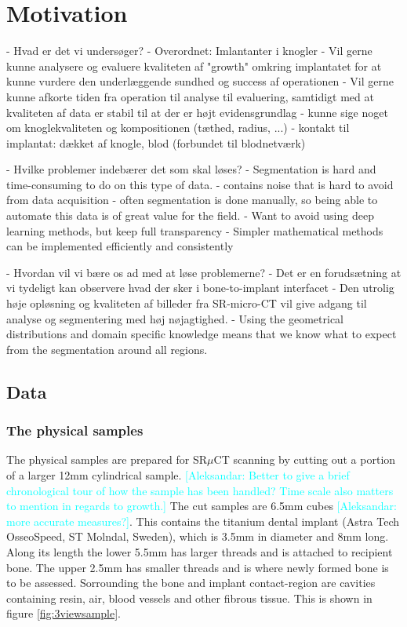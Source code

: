 \documentclass[times,twocolumn,final]{elsarticle}
\newcommand{\aleksandar}[1]{\textcolor{cyan}{[Aleksandar: #1]}}
\begin{document}

\newpage

\section*{Motivation}

 - Hvad er det vi undersøger?
    - Overordnet: Imlantanter i knogler
       - Vil gerne kunne analysere og evaluere kvaliteten af "growth" omkring implantatet
         for at kunne vurdere den underlæggende sundhed og success af operationen
       - Vil gerne kunne afkorte tiden fra operation til analyse til evaluering, samtidigt
         med at kvaliteten af data er stabil til at der er højt evidensgrundlag
       - kunne sige noget om knoglekvaliteten og kompositionen (tæthed, radius, ...)
       - kontakt til implantat: dækket af knogle, blod (forbundet til blodnetværk)
         
 - Hvilke problemer indebærer det som skal løses?
    - Segmentation is hard and time-consuming to do on this type of data.
      - contains noise that is hard to avoid from data acquisition
      - often segmentation is done manually, so being able to automate this data is of great value for the field.
      - Want to avoid using deep learning methods, but keep full transparency 
      - Simpler mathematical methods can be implemented efficiently and consistently

 - Hvordan vil vi bære os ad med at løse problemerne?
    - Det er en forudsætning at vi tydeligt kan observere hvad der sker i bone-to-implant interfacet
    - Den utrolig høje opløsning og kvaliteten af billeder fra SR-micro-CT vil give adgang til
      analyse og segmentering med høj nøjagtighed.
    - Using the geometrical distributions and domain specific knowledge means that we know
      what to expect from the segmentation around all regions.

\subsection*{Data}

\subsubsection*{The physical samples}

The physical samples are prepared for SR$\mu$CT scanning by cutting out a portion of a larger
12mm cylindrical sample. \aleksandar{Better to give a brief chronological tour of how the sample has been handled? Time scale also matters to mention in regards to growth.} The cut samples are 6.5mm cubes \aleksandar{more accurate measures?}. This contains the titanium dental implant (Astra Tech OsseoSpeed, ST Molndal, Sweden), which is 3.5mm in diameter and 8mm long. Along its length the lower 5.5mm has larger threads and is attached to recipient bone. The upper 2.5mm has smaller threads and is where newly formed bone is to be assessed. Sorrounding the bone and implant contact-region are cavities containing resin, air, blood vessels and other fibrous tissue. This is shown in figure \ref{fig:3viewsample}.
\end{document}
